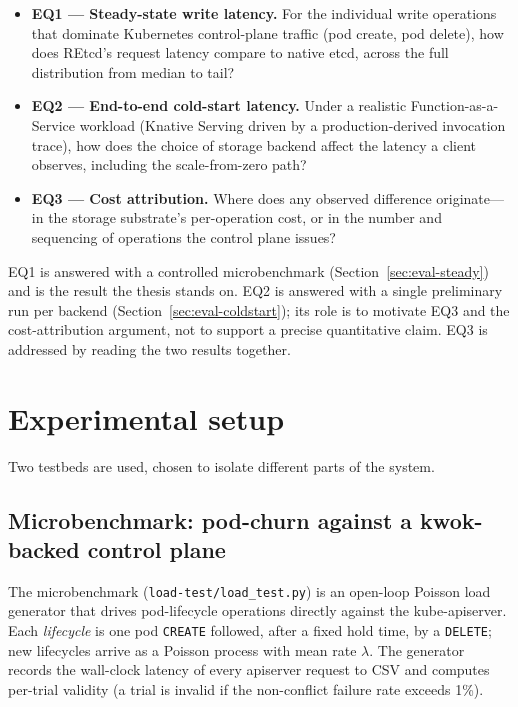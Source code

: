 \begin{itemize}
    \item \textbf{EQ1 --- Steady-state write latency.} For the individual write operations that dominate Kubernetes control-plane traffic (pod create, pod delete), how does REtcd's request latency compare to native etcd, across the full distribution from median to tail?
    \item \textbf{EQ2 --- End-to-end cold-start latency.} Under a realistic Function-as-a-Service workload (Knative Serving driven by a production-derived invocation trace), how does the choice of storage backend affect the latency a client observes, including the scale-from-zero path?
    \item \textbf{EQ3 --- Cost attribution.} Where does any observed difference originate---in the storage substrate's per-operation cost, or in the number and sequencing of operations the control plane issues?
\end{itemize}

EQ1 is answered with a controlled microbenchmark (Section~\ref{sec:eval-steady}) and is the result the thesis stands on. EQ2 is answered with a single preliminary run per backend (Section~\ref{sec:eval-coldstart}); its role is to motivate EQ3 and the cost-attribution argument, not to support a precise quantitative claim. EQ3 is addressed by reading the two results together.

\section{Experimental setup}
\label{sec:eval-setup}

Two testbeds are used, chosen to isolate different parts of the system.

\subsection{Microbenchmark: pod-churn against a kwok-backed control plane}
\label{sec:eval-micro-setup}

The microbenchmark (\texttt{load-test/load\_test.py}) is an open-loop Poisson load generator that drives pod-lifecycle operations directly against the kube-apiserver. Each \emph{lifecycle} is one pod \texttt{CREATE} followed, after a fixed hold time, by a \texttt{DELETE}; new lifecycles arrive as a Poisson process with mean rate $\lambda$. The generator records the wall-clock latency of every apiserver request to CSV and computes per-trial validity (a trial is invalid if the non-conflict failure rate exceeds 1\%).

